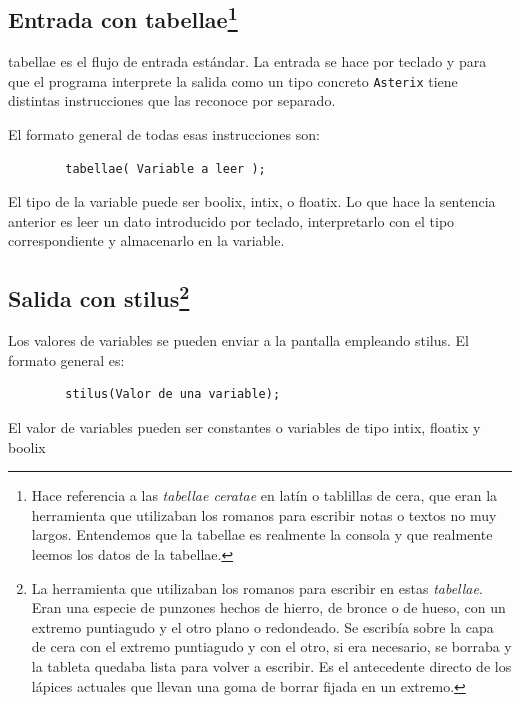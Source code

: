 \documentclass[a4paper, 9pt]{article}
\newcommand{\atx}{\texttt{Asterix} }
\begin{document}
    \subsection*{Entrada con tabellae\footnote{Hace referencia a las
    \textit{tabellae ceratae} en latín o tablillas de cera, que eran la
    herramienta que utilizaban los romanos para escribir notas o textos no muy
    largos. Entendemos que la tabellae es realmente la consola y que realmente
    leemos los datos de la tabellae.}}
    
    \textsf{tabellae} es el flujo de entrada estándar. La entrada se hace por
    teclado y para que el programa interprete la salida como un tipo concreto
    \atx tiene distintas instrucciones que las reconoce por separado.
    
    El formato general de todas esas instrucciones son:
    
    \begin{verbatim}
        tabellae( Variable a leer );
    \end{verbatim}
    
    El tipo de la variable  puede ser \textsf{boolix}, \textsf{intix}, o
    \textsf{floatix}. Lo que hace la sentencia anterior es leer un dato
    introducido por teclado, interpretarlo con el tipo correspondiente y
    almacenarlo en la variable. 

    \subsection*{Salida con stilus\footnote{La herramienta que utilizaban los
    romanos para escribir en estas \textit{tabellae}. Eran una especie de
    punzones hechos de hierro, de bronce o de hueso, con un extremo puntiagudo
    y el otro plano o redondeado. Se escribía sobre la capa de cera con el
    extremo puntiagudo y con el otro, si era necesario, se borraba y la tableta
    quedaba lista para volver a escribir. Es el antecedente directo de los
    lápices actuales que llevan una goma de borrar fijada en un extremo.}}
    
     Los valores de variables se pueden enviar a la pantalla empleando
     \textsf{stilus}. El formato general es:
    
    \begin{verbatim}
        stilus(Valor de una variable);
    \end{verbatim}
    
    El valor de variables pueden ser constantes o variables     
    de tipo \textsf{intix}, \textsf{floatix} y \textsf{boolix}
    
\end{document}
